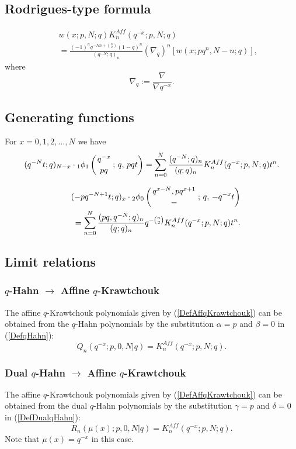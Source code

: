 \documentclass[envcountchap,graybox]{svmono}
\newcounter{rom}
\newcommand{\qhyp}[5]{\mbox{}_{#1}{\phi}_{#2}
\left(\genfrac{}{}{0pt}{}{#3}{#4}\,;\,q,\,#5\right)}
\begin{document}
\subsection*{Rodrigues-type formula}
\begin{eqnarray}
\label{RodAffqKrawtchouk}
& &w(x;p,N;q)K_n^{Aff}(q^{-x};p,N;q)\nonumber\\
& &{}=\frac{(-1)^nq^{-Nn+\binom{n}{2}}(1-q)^n}{(q^{-N};q)_n}\left(\nabla_q\right)^n\left[w(x;pq^n,N-n;q)\right],
\end{eqnarray}
where
$$\nabla_q:=\frac{\nabla}{\nabla q^{-x}}.$$

\subsection*{Generating functions} For $x=0,1,2,\ldots,N$ we have
\begin{equation}
\label{GenAffqKrawtchouk1}
(q^{-N}t;q)_{N-x}\cdot\qhyp{1}{1}{q^{-x}}{pq}{pqt}=\sum_{n=0}^N
\frac{(q^{-N};q)_n}{(q;q)_n}K_n^{Aff}(q^{-x};p,N;q)t^n.
\end{equation}

\begin{eqnarray}
\label{GenAffqKrawtchouk2}
& &(-pq^{-N+1}t;q)_x\cdot\qhyp{2}{0}{q^{x-N},pq^{x+1}}{-}{-q^{-x}t}\nonumber\\
& &{}=\sum_{n=0}^N\frac{(pq,q^{-N};q)_n}{(q;q)_n}q^{-\binom{n}{2}}K_n^{Aff}(q^{-x};p,N;q)t^n.
\end{eqnarray}

\subsection*{Limit relations}

\subsubsection*{$q$-Hahn $\rightarrow$ Affine $q$-Krawtchouk}
The affine $q$-Krawtchouk polynomials given by (\ref{DefAffqKrawtchouk})
can be obtained from the $q$-Hahn polynomials by the substitution $\alpha=p$ and
$\beta=0$ in (\ref{DefqHahn}):
$$Q_n(q^{-x};p,0,N|q)=K_n^{Aff}(q^{-x};p,N;q).$$

\subsubsection*{Dual $q$-Hahn $\rightarrow$ Affine $q$-Krawtchouk}
The affine $q$-Krawtchouk polynomials given by (\ref{DefAffqKrawtchouk})
can be obtained from the dual $q$-Hahn polynomials by the substitution $\gamma=p$
and $\delta=0$ in (\ref{DefDualqHahn}):
$$R_n(\mu(x);p,0,N|q)=K_n^{Aff}(q^{-x};p,N;q).$$
Note that $\mu(x)=q^{-x}$ in this case.
\end{document}
